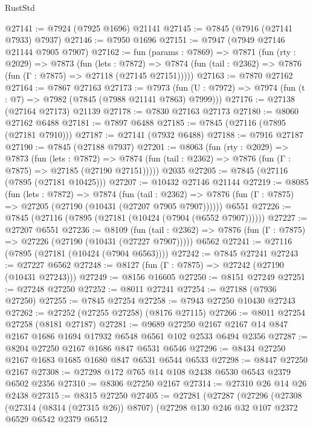 \begin{lexlean}{RustStd}
\begin{coremodule}
@27141 := @7924 (@7925 @1696) @21141
@27145 := @7845 (@7916 (@27141 @7933) @7937)
@27146 := @7950 @1696
@27151 := @7947 (@7949 @27146 @21144 @7905 @7907)
@27162 := fun (params : @7869) =>
  @7871
    (fun (rty : @2029) =>
    @7873
      (fun (lets : @7872) =>
      @7874 (fun (tail : @2362) => @7876 (fun (Γ : @7875) => @27118 (@27145 @27151)))))
@27163 := @7870 @27162
@27164 := @7867 @27163
@27173 := @7973
    (fun (U : @7972) => @7974 (fun (t : @7) => @7982 (@7845 (@7988 @21141 @7863) @7999)))
@27176 := @27138 (@27164 @27173) @21139
@27178 := @7830 @27163 @27173
@27180 := @8060 @27162 @6488
@27181 := @7897 @6488
@27185 := @7845 (@27116 (@7895 (@27181 @7910)))
@27187 := @27141 (@7932 @6488)
@27188 := @7916 @27187
@27190 := @7845 (@27188 @7937)
@27201 := @8063
    (fun (rty : @2029) =>
    @7873
      (fun (lets : @7872) =>
      @7874 (fun (tail : @2362) => @7876 (fun (Γ : @7875) => @27185 (@27190 @27151)))))
    @2035
@27205 := @7845 (@27116 (@7895 (@27181 @10425)))
@27207 := @10432 @27146 @21144
@27219 := @8085
    (fun (lets : @7872) =>
    @7874
      (fun (tail : @2362) =>
      @7876 (fun (Γ : @7875) => @27205 (@27190 (@10431 (@27207 @7905 @7907))))))
    @6551
@27226 := @7845 (@27116 (@7895 (@27181 (@10424 (@7904 (@6552 @7907))))))
@27227 := @27207 @6551
@27236 := @8109
    (fun (tail : @2362) => @7876 (fun (Γ : @7875) => @27226 (@27190 (@10431 (@27227 @7907)))))
    @6562
@27241 := @27116 (@7895 (@27181 (@10424 (@7904 @6563))))
@27242 := @7845 @27241
@27243 := @27227 @6562
@27248 := @8127 (fun (Γ : @7875) => @27242 (@27190 (@10431 @27243)))
@27249 := @8156 @16605
@27250 := @8151 @27249
@27251 := @27248 @27250
@27252 := @8011 @27241
@27254 := @27188 (@7936 @27250)
@27255 := @7845 @27254
@27258 := @7943 @27250 @10430 @27243
@27262 := @27252 (@27255 @27258) (@8176 @27115)
@27266 := @8011 @27254 @27258 (@8181 @27187)
@27281 := @9689
    @27250
    @2167
    @2167
    @14
    @847
    @2167
    @1686
    @1694
    @17932
    @6548
    @6561
    @102
    @2533
    @6494
    @2356
@27287 := @8204 @27250 @2167 @1686 @847 @6531 @6546
@27296 := @8434 @27250 @2167 @1683 @1685 @1680 @847 @6531 @6544 @6533
@27298 := @8447 @27250 @2167
@27308 := @27298 @172 @765 @14 @108 @2438 @6530 @6543 @2379 @6502 @2356
@27310 := @8306 @27250 @2167
@27314 := @27310 @26 @14 @26 @2438
@27315 := @8315 @27250
@27405 := @27281
    (@27287
      (@27296
        (@27308
          (@27314 (@8314 (@27315 @26)) @8707)
          (@27298
            @130
            @246
            @32
            @107
            @2372
            @6529
            @6542
            @2379
            @6512

\end{coremodule}
\end{lexlean}
